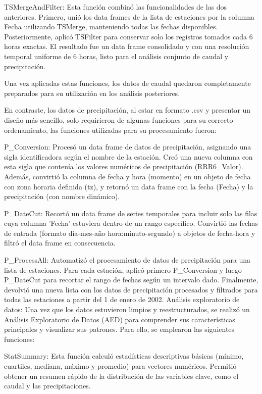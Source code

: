 \documentclass[hess, manuscript]{copernicus}
\begin{document}
TSMergeAndFilter: Esta función combinó las funcionalidades de las dos anteriores. Primero, unió los data frames de la lista de estaciones por la columna Fecha utilizando TSMerge, manteniendo todas las fechas disponibles. Posteriormente, aplicó TSFilter para conservar solo los registros tomados cada 6 horas exactas. El resultado fue un data frame consolidado y con una resolución temporal uniforme de 6 horas, listo para el análisis conjunto de caudal y precipitación.

Una vez aplicadas estas funciones, los datos de caudal quedaron completamente preparados para su utilización en los análisis posteriores.

En contraste, los datos de precipitación, al estar en formato .csv y presentar un diseño más sencillo, solo requirieron de algunas funciones para su correcto ordenamiento, las funciones utilizadas para su procesamiento fueron:

P_Conversion: Procesó un data frame de datos de precipitación, asignando una sigla identificadora según el nombre de la estación. Creó una nueva columna con esta sigla que contenía los valores numéricos de precipitación (RRR6_Valor). Además, convirtió la columna de fecha y hora (momento) en un objeto de fecha con zona horaria definida (tz), y retornó un data frame con la fecha (Fecha) y la precipitación (con nombre dinámico).

P_DateCut: Recortó un data frame de series temporales para incluir solo las filas cuya columna 'Fecha' estuviera dentro de un rango específico. Convirtió las fechas de entrada (formato día-mes-año hora:minuto-segundo) a objetos de fecha-hora y filtró el data frame en consecuencia.

P_ProcessAll: Automatizó el procesamiento de datos de precipitación para una lista de estaciones. Para cada estación, aplicó primero P_Conversion y luego P_DateCut para recortar el rango de fechas según un intervalo dado. Finalmente, devolvió una nueva lista con los datos de precipitación procesados y filtrados para todas las estaciones a partir del 1 de enero de 2002.
Análisis exploratorio de datos:
Una vez que los datos estuvieron limpios y reestructurados, se realizó un Análisis Exploratorio de Datos (AED) para comprender sus características principales y visualizar sus patrones. Para ello, se emplearon las siguientes funciones:

StatSummary: Esta función calculó estadísticas descriptivas básicas (mínimo, cuartiles, mediana, máximo y promedio) para vectores numéricos. Permitió obtener un resumen rápido de la distribución de las variables clave, como el caudal y las precipitaciones.
\end{document}
